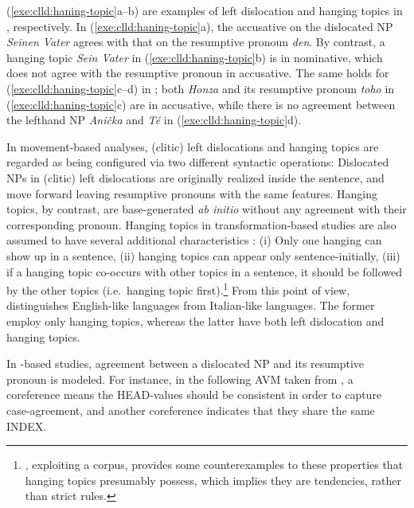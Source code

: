 \noindent (\ref{exe:clld:haning-topic}a--b) are examples of left
dislocation and hanging topics in , respectively.  In
(\ref{exe:clld:haning-topic}a), the accusative on the dislocated NP
\textit{Seinen Vater} agrees with that on the resumptive pronoun
\textit{den}. By contrast, a hanging topic \textit{Sein Vater} in
(\ref{exe:clld:haning-topic}b) is in nominative, which does not agree
with the resumptive pronoun in accusative. The same holds for
(\ref{exe:clld:haning-topic}c--d) in ; both \textit{Honza}
and its resumptive pronoun \textit{toho} in
(\ref{exe:clld:haning-topic}c) are in accusative, while there is no
agreement between the lefthand NP \textit{Ani\v{c}ka} and
\textit{T\'{e}} in (\ref{exe:clld:haning-topic}d).


In movement-based analyses, (clitic) left dislocations and hanging
topics are regarded as being configured via two different syntactic
operations: Dislocated NPs in (clitic) left dislocations are
originally realized inside the sentence, and move forward leaving
resumptive pronouns with the same features. Hanging topics, by
contrast, are base-generated \textit{ab initio} without any agreement
with their corresponding pronoun. Hanging topics in
transformation-based studies are also assumed to have several
additional characteristics \citep{frascarelli:00}: (i) Only one
hanging  can show up in a sentence, (ii) hanging topics can
appear only sentence-initially, (iii) if a hanging topic co-occurs
with other topics in a sentence, it should be followed by the other
topics (i.e.\ hanging topic first).\footnote{\citet{frascarelli:00},
  exploiting a corpus, provides some counterexamples to these
  properties that hanging topics presumably possess, which implies
  they are tendencies, rather than strict rules.}  From this point of
view, \cite{cinque:77} distinguishes English-like languages from
Italian-like languages. The former employ only
hanging topics, whereas the latter have both left dislocation and
hanging topics.


In -based studies, agreement between a dislocated NP and its
resumptive pronoun is modeled. For instance, in the following AVM
taken from \citet[350]{bildhauer:08}, a coreference  means
the HEAD-values should be consistent in order to capture
case-agreement, and another coreference  indicates that they
share the same INDEX.




